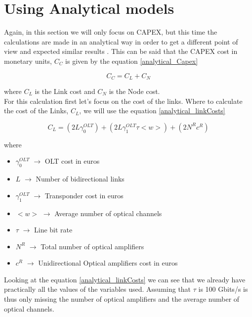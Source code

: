 \clearpage

\section{Using Analytical models}\label{analytical_CAPEX}

Again, in this section we will only focus on CAPEX, but this time the calculations are made in an analytical way in order to get a different point of view and expected similar results \cite{aulas}.
This can be said that the CAPEX cost in monetary units, $C_C$ is given by the equation \ref{analytical_Capex}

\begin{equation}
C_C = C_L + C_N
\label{analytical_Capex}
\end{equation}

\vspace{11pt}
\noindent
where $C_L$ is the Link cost and $C_N$ is the Node cost.\\

For this calculation first let's focus on the cost of the links. Where to calculate the cost of the Links, $C_L$, we will use the equation \ref{analytical_linkCosts}

\begin{equation}
C_L = \left(2 L \gamma_0^{OLT}\right) + \left(2 L \gamma_1^{OLT} \tau <w>\right) + \left(2 N^R c^R\right)
\label{analytical_linkCosts}
\end{equation}

\vspace{11pt}
\noindent
where
\begin{itemize}
\item{$\gamma_0^{OLT}$	$\rightarrow$	OLT cost in euros}
\item{$L$				$\rightarrow$	Number of bidirectional links}
\item{$\gamma_1^{OLT}$	$\rightarrow$	Transponder cost in euros}
\item{$<w>$             $\rightarrow$   Average number of optical channels}
\item{$\tau$		    $\rightarrow$	Line bit rate}
\item{$N^R$				$\rightarrow$	Total number of optical amplifiers}
\item{$c^R$				$\rightarrow$	Unidirectional Optical amplifiers cost in euros}
\end{itemize}

\vspace{11pt}
Looking at the equation \ref{analytical_linkCosts} we can see that we already have practically all the values of the variables used. Assuming that $\tau$ is 100 Gbits/s is thus only missing the number of optical amplifiers and the average number of optical channels.\\

